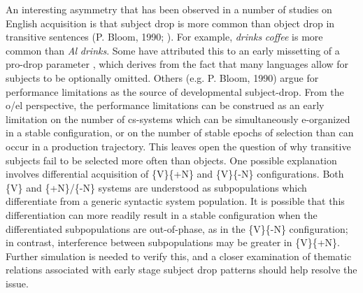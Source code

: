   An interesting asymmetry that has been observed in a number of studies on English acquisition is that subject drop is more common than object drop in transitive sentences (P. Bloom, 1990; \citealt{Valian1991}). For example, \textit{drinks} \textit{coffee} is more common than \textit{Al} \textit{drinks}. Some have attributed this to an early missetting of a pro-drop parameter \citep{Hyams2012}, which derives from the fact that many languages allow for subjects to be optionally omitted. Others (e.g. P. Bloom, 1990) argue for performance limitations as the source of developmental subject-drop. From the o/el perspective, the performance limitations can be construed as an early limitation on the number of cs-systems which can be simultaneously e-organized in a stable configuration, or on the number of stable epochs of selection than can occur in a production trajectory. This leaves open the question of why transitive subjects fail to be selected more often than objects. One possible explanation involves differential acquisition of \{V\}\{+N\} and \{V\}\{-N\} configurations. Both \{V\} and \{+N\}/\{-N\} systems are understood as subpopulations which differentiate from a generic syntactic system population. It is possible that this differentiation can more readily result in a stable configuration when the differentiated subpopulations are out-of-phase, as in the \{V\}\{-N\} configuration; in contrast, interference between subpopulations may be greater in \{V\}\{+N\}. Further simulation is needed to verify this, and a closer examination of thematic relations associated with early stage subject drop patterns should help resolve the issue.

